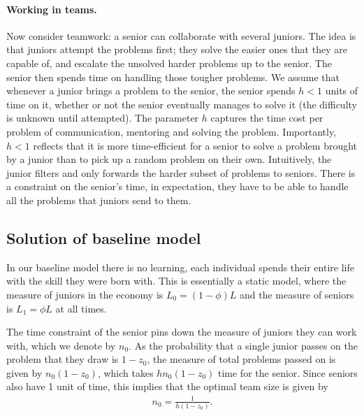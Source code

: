 \documentclass[12pt]{article}
\begin{document}
\paragraph{Working in teams.} Now consider teamwork: a senior can collaborate with several juniors. The idea is that juniors attempt the problems first; they solve the easier ones that they are capable of, and escalate the unsolved harder problems up to the senior. The senior then spends time on handling those tougher problems. We assume that whenever a junior brings a problem to the senior, the senior spends \(h < 1\) units of time on it, whether or not the senior eventually manages to solve it (the difficulty is unknown until attempted). The parameter \(h\) captures the time cost per problem of communication, mentoring and solving the problem. Importantly, \(h<1\) reflects that it is more time-efficient for a senior to solve a problem brought by a junior than to pick up a random problem on their own. Intuitively, the junior filters and only forwards the harder subset of problems to seniors. There is a constraint on the senior's time, in expectation, they have to be able to handle all the problems that juniors send to them.

\subsection{Solution of baseline model} 

In our baseline model there is no learning, each individual spends their entire life with the skill they were born with. This is essentially a static model, where the measure of juniors in the economy is $L_0=(1-\phi)L$ and the measure of seniors is $L_1=\phi L$ at all times.

The time constraint of the senior pins down the measure of juniors they can work with, which we denote by $n_0$. As the probability that a single junior passes on the problem that they draw is $1-z_0$, the measure of total problems passed on is given by $n_0(1-z_0)$, which takes $hn_0(1-z_0)$ time for the senior. Since seniors also have 1 unit of time, this implies that the optimal team size is given by
\begin{align}\label{eq:team_size}
n_0=\frac{1}{h(1-z_0)}.
\end{align}
\end{document}
